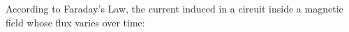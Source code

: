 According to Faraday's Law, the current induced in a 
circuit inside a magnetic field
whose flux varies over time: